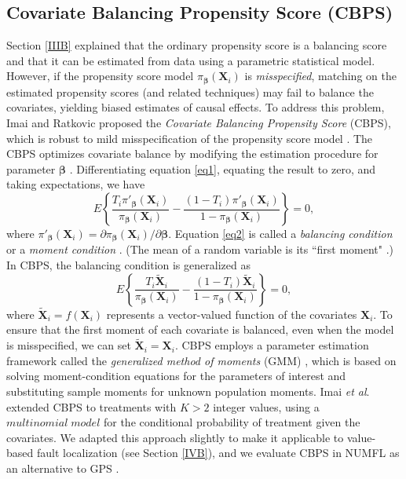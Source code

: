 \documentclass[times]{stvrauth}
\begin{document}
\subsection{Covariate Balancing Propensity Score (CBPS)}\label{IIID}
Section \ref{IIIB} explained that the ordinary propensity score is a balancing score and that it can be estimated from data using a parametric statistical model.  However, if the propensity score model ${\pi _{\pmb \beta} }({\pmb{X}_i})$  is {\it misspecified}, matching on the estimated propensity scores (and related techniques) may fail to balance the covariates, yielding biased estimates of causal effects. To address this problem, Imai and Ratkovic proposed the {\it Covariate Balancing Propensity Score} (CBPS), which is robust to mild misspecification of the propensity score model \cite{Imai2014}.
The CBPS optimizes covariate balance by modifying the estimation procedure for parameter $\pmb{\beta}$ .  Differentiating equation \eqref{eq1}, equating the result to zero, and taking expectations, we have \cite{Imai2014}
\begin{equation}\label{eq2}
E\left\{ {\frac{{{T_i}{{\pi '}_{\pmb \beta} }({\pmb{X}_i})}}{{{\pi _{\pmb \beta} }({\pmb{X}_i})}} - \frac{{(1 - {T_i}){{\pi '}_{\pmb \beta} }({\pmb{X}_i})}}{{1 - {\pi _{\pmb \beta} }({\pmb{X}_i})}}} \right\} = 0,
\end{equation}
where ${\pi '_{\pmb \beta} }({\pmb{X}_i}) = \partial {\pi _{\pmb \beta} }({\pmb{X}_i})/\partial \pmb{\beta}$.  Equation \eqref{eq2} is called a {\it balancing condition} or a {\it moment condition} \cite{Imai2014}.  (The mean of a random variable is its ``first moment" \cite{Rosenblueth1981}.)  In CBPS, the balancing condition is generalized as
\begin{equation}\label{eq3}
E\left\{ {\frac{{{T_i}{{\tilde {\pmb X}}_i}}}{{{\pi _{\pmb \beta} }({\pmb{X}_i})}} - \frac{{(1 - {T_i}){{\tilde {\pmb X}}_i}}}{{1 - {\pi _{\pmb \beta} }({\pmb{X}_i})}}} \right\} = 0,
\end{equation}
where ${\tilde {\pmb X}_i} = f({\pmb{X}_i})$ represents a vector-valued function of the covariates $\pmb{X}_i$. To ensure that the first moment of each covariate is balanced, even when the model is misspecified, we can set ${\tilde {\pmb X}_i} = {\pmb{X}_i}$. CBPS employs a parameter estimation framework called the {\it generalized method of moments} (GMM) \cite{Hansen1982}, which is based on solving moment-condition equations for the parameters of interest and substituting sample moments for unknown population moments. Imai {\it et al}. extended CBPS to treatments with $K>2$ integer values, using a $multinomial\;model$ for the conditional probability of treatment given the covariates. We adapted this approach slightly to make it applicable to value-based fault localization (see Section \ref{IVB}), and we evaluate CBPS in NUMFL as an alternative to GPS .
\end{document}
